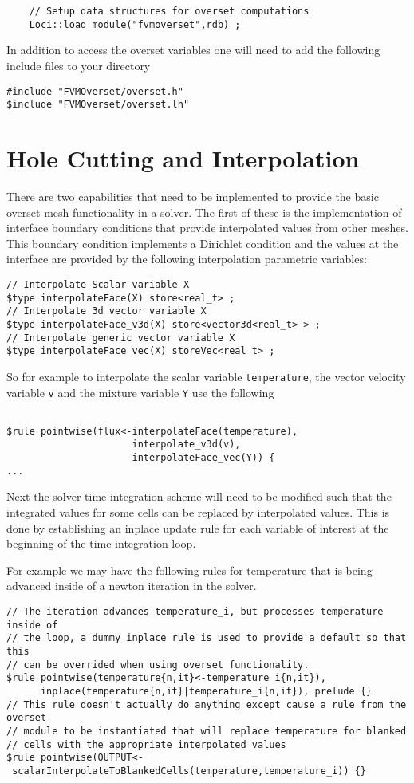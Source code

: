 \documentclass{article}
\begin{document}
\begin{verbatim}
    // Setup data structures for overset computations
    Loci::load_module("fvmoverset",rdb) ;
\end{verbatim}

In addition to access the overset variables one will need to add the following include files to your directory
\begin{verbatim}
#include "FVMOverset/overset.h"
$include "FVMOverset/overset.lh"
\end{verbatim}

\section{Hole Cutting and Interpolation}


There are two capabilities that need to be implemented to provide the
basic overset mesh functionality in a solver.  The first of these is
the implementation of interface boundary conditions that provide
interpolated values from other meshes.  This boundary condition
implements a Dirichlet condition and the values at the interface are
provided by the following interpolation parametric variables:
\begin{verbatim}
// Interpolate Scalar variable X
$type interpolateFace(X) store<real_t> ;
// Interpolate 3d vector variable X
$type interpolateFace_v3d(X) store<vector3d<real_t> > ;
// Interpolate generic vector variable X
$type interpolateFace_vec(X) storeVec<real_t> ;
\end{verbatim}

So for example to interpolate the scalar variable {\tt temperature}, the vector velocity variable {\tt v} and the mixture variable {\tt Y} use the following
\begin{verbatim}

$rule pointwise(flux<-interpolateFace(temperature),
                      interpolate_v3d(v),
                      interpolateFace_vec(Y)) { 
...
\end{verbatim}

Next the solver time integration scheme will need to be modified such that the integrated values for some cells can be replaced by interpolated values.  This is done by establishing an inplace update rule for each variable of interest at the beginning of the time integration loop.

For example we may have the following rules for temperature that is being advanced inside of a newton iteration in the solver.
\begin{verbatim}
// The iteration advances temperature_i, but processes temperature inside of
// the loop, a dummy inplace rule is used to provide a default so that this
// can be overrided when using overset functionality.
$rule pointwise(temperature{n,it}<-temperature_i{n,it}),
      inplace(temperature{n,it}|temperature_i{n,it}), prelude {}
// This rule doesn't actually do anything except cause a rule from the overset
// module to be instantiated that will replace temperature for blanked
// cells with the appropriate interpolated values
$rule pointwise(OUTPUT<-
 scalarInterpolateToBlankedCells(temperature,temperature_i)) {}
\end{verbatim}
\end{document}
